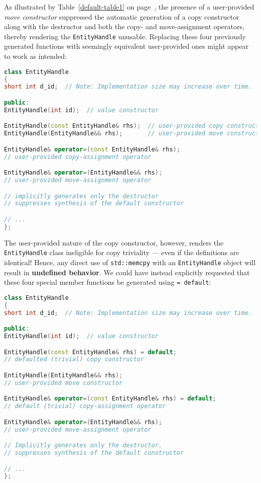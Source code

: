 \noindent As illustrated by Table~\ref{default-table1} on page~\pageref{default-table1}, the
presence of a user-provided \emph{move constructor} suppressed the
automatic generation of a copy constructor along with the destructor
and both the copy- and move-assignment operators, thereby rendering the
\texttt{EntityHandle} unusable. Replacing these four previously
generated functions with seemingly equivalent user-provided ones might
appear to work as intended:

\begin{lstlisting}[language=C++]
class EntityHandle
{
short int d_id;  // Note: Implementation size may increase over time.

public:
EntityHandle(int id);  // value constructor

EntityHandle(const EntityHandle& rhs);  // user-provided copy constructor
EntityHandle(EntityHandle&& rhs);       // user-provided move constructor

EntityHandle& operator=(const EntityHandle& rhs);
// user-provided copy-assignment operator

EntityHandle& operator=(EntityHandle&& rhs);
// user-provided move-assignment operator

// implicitly generates only the destructor
// suppresses synthesis of the default constructor

// ...
};
\end{lstlisting}

\noindent The user-provided nature of the copy constructor, however, renders the
\texttt{EntityHandle} class ineligible for copy triviality --- even if
the definitions are identical! Hence, any direct use of
\texttt{std::memcpy} with an \texttt{EntityHandle} object will result in
\textbf{undefined behavior}. We could have instead explicitly requested
that these four special member functions be generated using
\texttt{=}~\texttt{default}:

\begin{lstlisting}[language=C++]
class EntityHandle
{
short int d_id;  // Note: Implementation size may increase over time.

public:
EntityHandle(int id);  // value constructor

EntityHandle(const EntityHandle& rhs) = default;
// defaulted (trivial) copy constructor

EntityHandle(EntityHandle&& rhs);
// user-provided move constructor

EntityHandle& operator=(const EntityHandle& rhs) = default;
// default (trivial) copy-assignment operator

EntityHandle& operator=(EntityHandle&& rhs);
// user-provided move-assignment operator

// Implicitly generates only the destructor.
// suppresses synthesis of the default constructor

// ...
};
\end{lstlisting}

